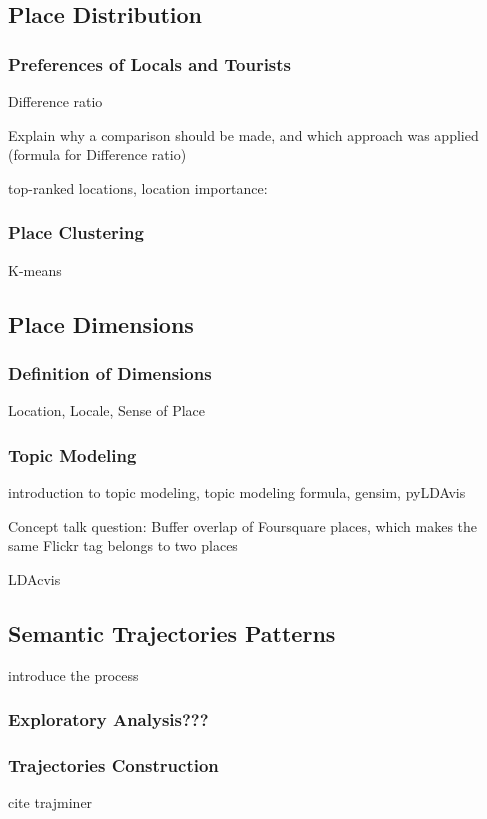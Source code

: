\documentclass{article}
\begin{document}
\subsection{Place Distribution}
\subsubsection{Preferences of Locals and Tourists}
Difference ratio

Explain why a comparison should be made, and which approach was applied (formula for Difference ratio)

top-ranked locations, location importance: \cite{yin_diversified_2011}

\subsubsection{Place Clustering}
K-means

\subsection{Place Dimensions}
\subsubsection{Definition of Dimensions}
Location, Locale, Sense of Place
\subsubsection{Topic Modeling}
introduction to topic modeling, topic modeling formula, gensim, pyLDAvis

Concept talk question: Buffer overlap of Foursquare places, which makes the same Flickr tag belongs to two places

LDAcvis

\subsection{Semantic Trajectories Patterns}
introduce the process
\cite{alvares_model_2007}

\subsubsection{Exploratory Analysis???}

\subsubsection{Trajectories Construction}
cite trajminer
\end{document}
